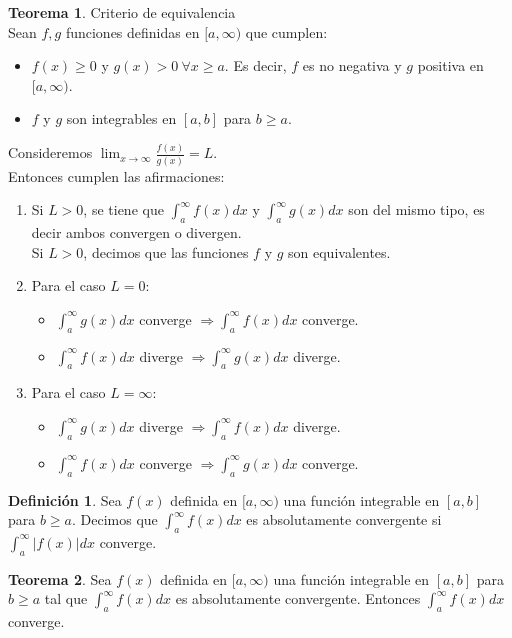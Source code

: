 \documentclass[10pt]{article}
\theoremstyle{definition}
\newtheorem{definition}{Definición}[section]
\newtheorem{theorem}{Teorema}[section]
\begin{document}
\begin{theorem}{Criterio de equivalencia}
	\\Sean $f,g$ funciones definidas en $[a,\infty)$ que cumplen:
	\begin{itemize}
		\item $f(x)\ge 0$ y $g(x)>0\ \forall x\ge a$. Es decir, $f$ es no negativa y $g$ positiva en $[a,\infty)$.
		\item $f$ y $g$ son integrables en $[a,b]$ para $b\ge a$.
	\end{itemize}
	Consideremos $\lim_{x \to \infty} \frac{f(x)}{g(x)}=L$.
	\\Entonces cumplen las afirmaciones:
	\begin{enumerate}
		\item Si $L>0$, se tiene que $\int_{a}^{\infty} f(x) dx$  y $\int_{a}^{\infty} g(x) dx$ son del mismo tipo, es decir ambos convergen o divergen.
		      \\Si $L>0$, decimos que las funciones $f$ y $g$ son equivalentes.
		\item Para el caso $L=0$:
		      \begin{itemize}
			      \item $\int_{a}^{\infty} g(x) dx$ converge $\Rightarrow \int_{a}^\infty f(x) dx$ converge.
			      \item $\int_{a}^{\infty} f(x) dx$ diverge $\Rightarrow \int_{a}^{\infty} g(x) dx$ diverge.
		      \end{itemize}
		\item Para el caso $L=\infty$:
		      \begin{itemize}
			      \item $\int_{a}^{\infty} g(x) dx$ diverge $\Rightarrow \int_{a}^{\infty} f(x) dx$ diverge.
			      \item $\int_{a}^{\infty} f(x) dx$ converge $\Rightarrow \int_{a}^{\infty} g(x) dx$ converge.
		      \end{itemize}
	\end{enumerate}
\end{theorem}
\begin{definition}
	Sea $f(x)$ definida en $[a,\infty)$ una función integrable en $[a,b]$ para $b\ge a$. Decimos que $\int_{a}^{\infty} f(x) dx$ es absolutamente convergente si $\int_{a}^{\infty} |f(x)| dx$ converge.
\end{definition}
\begin{theorem}
	Sea $f(x)$ definida en $[a,\infty)$ una función integrable en $[a,b]$ para $b\ge a$ tal que $\int_{a}^{\infty} f(x) dx$ es absolutamente convergente. Entonces $\int_{a}^{\infty} f(x) dx$ converge.
\end{theorem}
\end{document}
